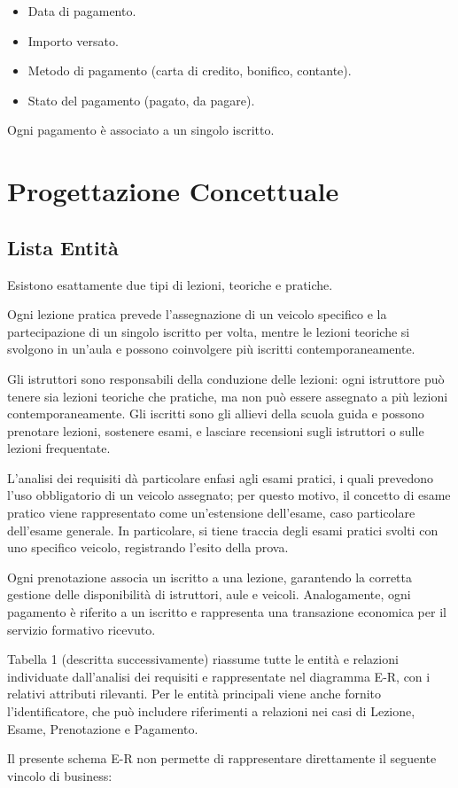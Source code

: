 \documentclass[10pt,twoside]{article}
\begin{document}
{    \begin{itemize}
        \item Data di pagamento.
        \item Importo versato.
        \item Metodo di pagamento (carta di credito, bonifico, contante).
        \item Stato del pagamento (pagato, da pagare).
    \end{itemize}

    Ogni pagamento è associato a un singolo iscritto.

}

\newpage

\section{Progettazione Concettuale}{
    \subsection{Lista Entità}{
        Esistono esattamente due tipi di lezioni, teoriche e pratiche.

        Ogni lezione pratica prevede l'assegnazione di un veicolo specifico e la partecipazione di un singolo iscritto per volta, mentre le lezioni teoriche si svolgono in un'aula e possono coinvolgere più iscritti contemporaneamente.

        Gli istruttori sono responsabili della conduzione delle lezioni: ogni istruttore può tenere sia lezioni teoriche che pratiche, ma non può essere assegnato a più lezioni contemporaneamente.
        Gli iscritti sono gli allievi della scuola guida e possono prenotare lezioni, sostenere esami, e lasciare recensioni sugli istruttori o sulle lezioni frequentate.

        L’analisi dei requisiti dà particolare enfasi agli esami pratici, i quali prevedono l’uso obbligatorio di un veicolo assegnato; per questo motivo, il concetto di esame pratico viene rappresentato come un'estensione dell'esame, caso particolare dell'esame generale.
        In particolare, si tiene traccia degli esami pratici svolti con uno specifico veicolo, registrando l’esito della prova.

        Ogni prenotazione associa un iscritto a una lezione, garantendo la corretta gestione delle disponibilità di istruttori, aule e veicoli.
        Analogamente, ogni pagamento è riferito a un iscritto e rappresenta una transazione economica per il servizio formativo ricevuto.

        Tabella 1 (descritta successivamente) riassume tutte le entità e relazioni individuate dall'analisi dei requisiti e rappresentate nel diagramma E-R, con i relativi attributi rilevanti.
        Per le entità principali viene anche fornito l'identificatore, che può includere riferimenti a relazioni nei casi di Lezione, Esame, Prenotazione e Pagamento.

        Il presente schema E-R non permette di rappresentare direttamente il seguente vincolo di business:
    }
}
\end{document}
